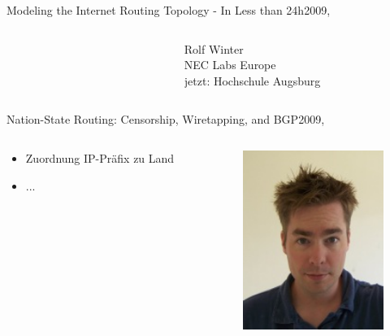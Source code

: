 \documentclass[ngerman,compress,hyperref={bookmarks}]{beamer}
\begin{document}
\begin{frame}{Modeling the Internet Routing Topology - In Less than 24h}{2009, \cite{Winter:2009:MIR:1577959.1577976}}
\begin{columns}[c]
\begin{column}{0.09\textwidth}
\begin{figure}
      \end{figure}
    \end{column}
    \begin{column}{0.3\textwidth}
      {\scriptsize Rolf Winter\\
      \vspace{0.2cm}
      NEC Labs Europe\\jetzt: Hochschule Augsburg\\}
    \end{column}
  \end{columns}
\end{frame}

\begin{frame}{Nation-State Routing: Censorship, Wiretapping, and BGP}{2009, \cite{0903.3218v1}}
  \begin{columns}[c]
    \begin{column}{0.5\textwidth}
      \begin{itemize}
        \item Zuordnung IP-Präfix zu Land
        \item ...
      \end{itemize}
    \end{column}
    \begin{column}{0.09\textwidth}
      \begin{figure}
        \label{karlin}
        \includegraphics[width=1\textwidth]{images/karlin_j}\\

\end{figure}
\end{column}
\end{columns}
\end{frame}
\end{document}
